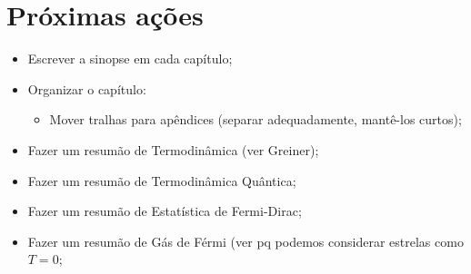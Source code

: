 \section{Próximas ações}

\begin{itemize}
	\item Escrever a sinopse em cada capítulo;
	\item Organizar o capítulo:
		\begin{itemize}
			\item Mover tralhas para apêndices (separar adequadamente, mantê-los curtos);
		\end{itemize}
	\item Fazer um resumão de Termodinâmica (ver Greiner);
	\item Fazer um resumão de Termodinâmica Quântica;
	\item Fazer um resumão de Estatística de Fermi-Dirac;
	\item Fazer um resumão de Gás de Férmi (ver pq podemos considerar estrelas como $T = 0$;
\end{itemize}
